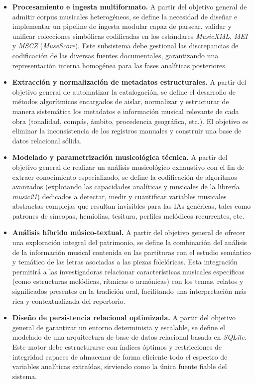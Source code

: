 \begin{itemize}
    \item \textbf{Procesamiento e ingesta multiformato.} A partir del objetivo general de admitir corpus musicales heterogéneos, se define la necesidad de diseñar e implementar un pipeline de ingesta modular capaz de parsear, validar y unificar colecciones simbólicas codificadas en los estándares \textit{MusicXML}, \textit{MEI} y \textit{MSCZ} (\textit{MuseScore}). Este subsistema debe gestional las discrepancias de codificación de las diversas fuentes documentales, garantizando una representación interna homogénea para las fases analíticas posteriores.
    \item \textbf{Extracción y normalización de metadatos estructurales.} A partir del objetivo general de automatizar la catalogación, se define el desarrollo de métodos algorítmicos encargados de aislar, normalizar y estructurar de manera sistemática los metadatos e información musical relevante de cada obra (tonalidad, compás, ámbito, procedencia geográfica, etc.). El objetivo es eliminar la inconsistencia de los registros manuales y construir una base de datos relacional sólida.
    \item \textbf{Modelado y parametrización musicológica técnica.} A partir del objetivo general de realizar un análisis musicológico exhaustivo con el fin de extraer conocimiento especializado, se define la codificación de algoritmos avanzados (explotando las capacidades analíticas y musicales de la librería \textit{music21}) dedicados a detectar, medir y cuantificar variables musicales abstractas complejas que resultan invisibles para las IAs genéricas, tales como patrones de síncopas, hemiolias, tesitura, perfiles melódicos recurrentes, etc.
    \item \textbf{Análisis híbrido músico-textual.} A partir del objetivo general de ofrecer una exploración integral del patrimonio, se define la combinación del análisis de la información musical contenida en las partituras con el estudio semántico y temático de las letras asociadas a las piezas folclóricas. Esta integración permitirá a las investigadoras relacionar características musicales específicas (como estructuras melódicas, rítmicas o armónicas) con los temas, relatos y significados presentes en la tradición oral, facilitando una interpretación más rica y contextualizada del repertorio.
    \item \textbf{Diseño de persistencia relacional optimizada.} A partir del objetivo general de garantizar un entorno determinista y escalable, se define el modelado de una arquitectura de base de datos relacional basada en \textit{SQLite}. Este motor debe estructurarse con índices óptimos y restricciones de integridad capaces de almacenar de forma eficiente todo el espectro de variables analíticas extraídas, sirviendo como la única fuente fiable del sistema.

\end{itemize}
